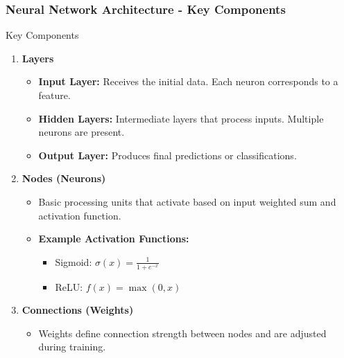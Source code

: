 \documentclass[aspectratio=169]{beamer}
\begin{document}
\begin{frame}[fragile]
    \frametitle{Neural Network Architecture - Key Components}
    \begin{block}{Key Components}
        \begin{enumerate}
            \item \textbf{Layers}
                \begin{itemize}
                    \item \textbf{Input Layer:} Receives the initial data. Each neuron corresponds to a feature.
                    \item \textbf{Hidden Layers:} Intermediate layers that process inputs. Multiple neurons are present.
                    \item \textbf{Output Layer:} Produces final predictions or classifications.
                \end{itemize}

            \item \textbf{Nodes (Neurons)}
                \begin{itemize}
                    \item Basic processing units that activate based on input weighted sum and activation function.
                    \item \textbf{Example Activation Functions:}
                        \begin{itemize}
                            \item Sigmoid: $\sigma(x) = \frac{1}{1 + e^{-x}}$
                            \item ReLU: $f(x) = \max(0, x)$
                        \end{itemize}
                \end{itemize}
                        
            \item \textbf{Connections (Weights)}
                \begin{itemize}
                    \item Weights define connection strength between nodes and are adjusted during training.
                \end{itemize}
        \end{enumerate}
    \end{block}
\end{frame}
\end{document}
